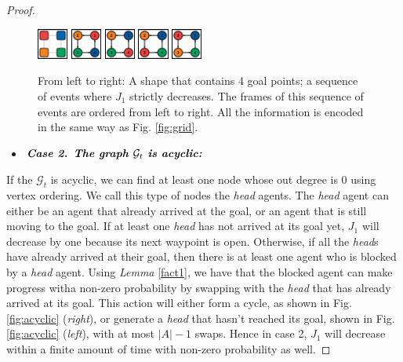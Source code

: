 \documentclass[journal]{IEEEtran}
\begin{document}
\begin{proof}
\begin{figure}[h!]
 \centering
 {\includegraphics[width=0.09\textwidth]{IEEEtran/cyclic/gaols.jpg}}
 {\includegraphics[width=0.09\textwidth]{IEEEtran/cyclic/c1.jpg}}
 {\includegraphics[width=0.09\textwidth]{IEEEtran/cyclic/c2.jpg}}
 {\includegraphics[width=0.09\textwidth]{IEEEtran/cyclic/c3.jpg}}
 {\includegraphics[width=0.09\textwidth]{IEEEtran/cyclic/c4.jpg}}
\caption{From left to right: A shape that contains 4 goal points; a sequence of events where $J_1$ strictly decreases. The frames of this sequence of events are ordered from left to right. All the information is encoded in the same way as Fig. \ref{fig:grid}.}
\label{fig:cyclic}
\end{figure}


\begin{itemize}
\item $\textit{\textbf{Case 2. The graph $\mathcal{G}_t$ is acyclic:}}$
\end{itemize}

If the $\mathcal{G}_t$ is acyclic, we can find at least one node whose out degree is 0 using vertex ordering. We call this type of nodes the \textit{head} agents. The \textit{head} agent can either be an agent that already arrived at the goal, or an agent that is still moving to the goal. If at least one \textit{head} has not arrived at its goal yet, $J_1$ will decrease by one because its next waypoint is open. Otherwise, if all the \textit{head}s have already arrived at their goal, then there is at least one agent who is blocked by a \textit{head} agent. Using \textit{Lemma} \ref{fact1}, we have that the blocked agent can make progress witha  non-zero probability by swapping with the \textit{head} that has already arrived at its goal. This action will either form a cycle, as shown in Fig. \ref{fig:acyclic} (\textit{right}), or generate a \textit{head} that hasn't reached its goal, shown in Fig. \ref{fig:acyclic} (\textit{left}), with at most $|A| - 1$ swaps. Hence in case 2, $J_1$ will decrease within a finite amount of time with non-zero probability as well.


\end{proof}
\end{document}
